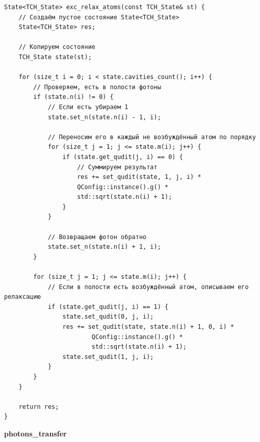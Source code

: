 \documentclass[12pt,fleqn]{article}
\begin{document}
\begin{mdframed}[linecolor=black, topline=true, bottomline=true,
leftline=false, rightline=false]
\begin{verbatim}
State<TCH_State> exc_relax_atoms(const TCH_State& st) {
    // Создаём пустое состояние State<TCH_State>
    State<TCH_State> res;

    // Копируем состояние
    TCH_State state(st);

    for (size_t i = 0; i < state.cavities_count(); i++) {
        // Проверяем, есть в полости фотоны
        if (state.n(i) != 0) {
            // Если есть убираем 1
            state.set_n(state.n(i) - 1, i);

            // Переносим его в каждый не возбуждённый атом по порядку
            for (size_t j = 1; j <= state.m(i); j++) {
                if (state.get_qudit(j, i) == 0) {
                    // Суммируем результат
                    res += set_qudit(state, 1, j, i) * 
                    QConfig::instance().g() * 
                    std::sqrt(state.n(i) + 1);
                }
            }

            // Возвращаем фотон обратно
            state.set_n(state.n(i) + 1, i);
        }

        for (size_t j = 1; j <= state.m(i); j++) {
            // Если в полости есть возбуждённый атом, описываем его релаксацию
            if (state.get_qudit(j, i) == 1) {
                state.set_qudit(0, j, i);
                res += set_qudit(state, state.n(i) + 1, 0, i) * 
                        QConfig::instance().g() * 
                        std::sqrt(state.n(i) + 1);
                state.set_qudit(1, j, i);
            }
        }
    }

    return res;
}
\end{verbatim}
\end{mdframed}

        \begin{center}
            \textbf{photons\_transfer}
        \end{center}
\end{document}
